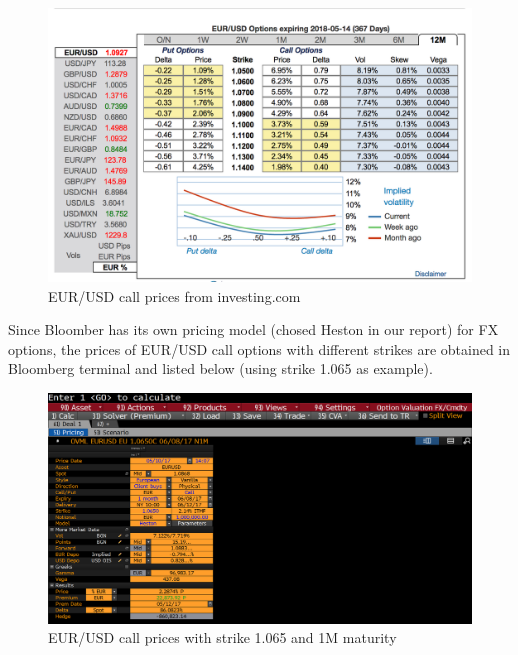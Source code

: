 \begin{figure}[tbph]
	\centering
	\includegraphics[scale=0.3]{./Testing-data/online/EURUSD_1Y_investing.png} 
	\caption{EUR/USD call prices from investing.com}
	\label{fig:prices-investing.com-1Y} 
\end{figure}
\newline
Since Bloomber has its own pricing model (chosed Heston in our report) for FX options, the prices of EUR/USD call options with different strikes are obtained in Bloomberg terminal and listed below (using strike 1.065 as example).
\begin{figure}[htb]
	\centering
	\includegraphics[scale=0.3]{./Testing-data/Heston-prices/May10EURUSD1M/eurusd1065HESTON1M.png} 
	\caption{EUR/USD call prices with strike 1.065 and 1M maturity}
	
	\label{fig:prices-investing.com-Heston-1M} %
\end{figure}
